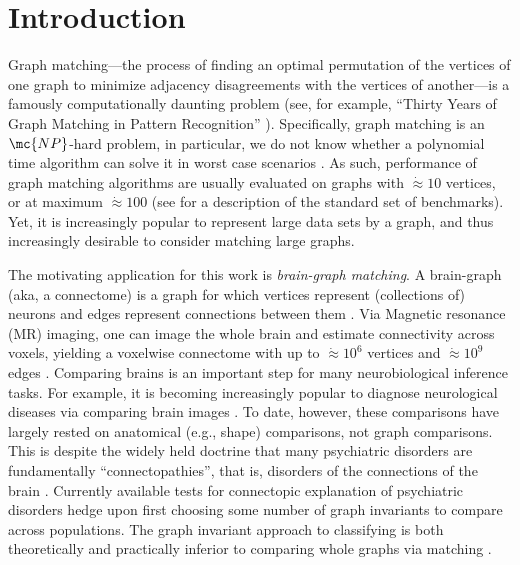 \documentclass[11pt]{article}
\begin{document}
\section{Introduction}

Graph matching---the process of finding an optimal permutation of the vertices of one graph to minimize adjacency disagreements with the vertices of another---is a famously computationally daunting problem (see, for example, ``Thirty Years of Graph Matching in Pattern Recognition''  \cite{Conte2004}). Specifically, graph matching is an $\mc{NP}$-hard problem, in particular, we do not know whether a polynomial time algorithm can solve it in worst case scenarios \cite{Papadimitriou1998}.  
As such, performance of graph matching algorithms are usually evaluated on graphs with $\dot{\approx} 10$ vertices, or at maximum $\dot{\approx} 100$ (see \cite{Burkard1997} for a description of the standard set of benchmarks).  Yet, it is increasingly popular to represent large data sets by a graph, and thus increasingly desirable to consider matching large graphs.  

The motivating application for this work is \emph{brain-graph matching}.  A brain-graph (aka, a connectome) is a graph for which vertices represent (collections of) neurons and edges represent connections between them \cite{SpornsKotter05, Hagmann05}. Via  Magnetic resonance (MR) imaging, one can image the whole brain and estimate connectivity across voxels, yielding a voxelwise connectome with up to $\dot{\approx} 10^6$ vertices and $\dot{\approx} 10^9$ edges \cite{Zuo2011}.  Comparing brains is an important step for many neurobiological inference tasks.  For example, it is becoming increasingly popular to diagnose neurological diseases via comparing brain images \cite{Csernansky2004}.  To date, however, these comparisons have largely rested on anatomical (e.g., shape) comparisons, not graph comparisons.  This is despite the widely held doctrine that many
psychiatric disorders are fundamentally ``connectopathies'', that is, disorders of the connections of the brain \cite{Kubicki2007,Calhoun2011,Fornito2012,Fornito2012a}. Currently available tests for connectopic explanation of psychiatric disorders  hedge upon first choosing some number of graph invariants to compare across populations. The graph invariant approach to classifying is both theoretically and practically inferior to comparing whole graphs via matching \cite{VP11_unlabeled}.  
\end{document}
